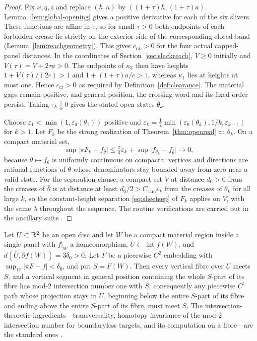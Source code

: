 \begin{proof}
Fix $x,q,z$ and replace $(h,a)$ by $((1+\tau)h,(1+\tau)a)$. Lemma~\ref{lem:global-opening} gives a positive derivative for each of the six slivers. These functions are affine in $\tau$, so for small $\tau>0$ both endpoints of each forbidden crease lie strictly on the exterior side of the corresponding closed band (Lemma~\ref{lem:reachgeometry}). This gives $c_{\mathrm{nb}}>0$ for the four actual capped-panel distances. In the coordinates of Section~\ref{sec:slackreach}, $V\ge0$ initially and $V(\tau)=V+2\tau a>0$. The endpoints of $\kappa_3$ then have heights $1+V(\tau)/(2c)>1$ and $1+(1+\tau)a/c>1$, whereas $\kappa_1$ lies at heights at most one. Hence $c_{\mathrm{cr}}>0$ as required by Definition~\ref{def:clearance}. The material gaps remain positive, and general position, the crossing word and its fixed order persist. Taking $\tau_k\downarrow0$ gives the stated open states $\theta_k$.

Choose $\varepsilon_1<\min(1,\varepsilon_0(\theta_1))$ positive and $\varepsilon_k=\frac12\min(\varepsilon_0(\theta_k),1/k,\varepsilon_{k-1})$ for $k>1$. Let $F_k$ be the strong realization of Theorem~\ref{thm:openreal} at $\theta_k$. On a compact material set,
\[
  \sup\lvert\pi F_k-f_{\bar\theta}\rvert\le\tfrac\pi4\varepsilon_k+\sup\lvert f_{\theta_k}-f_{\bar\theta}\rvert\longrightarrow0 ,
\]
because $\theta\mapsto f_\theta$ is uniformly continuous on compacta: vertices and directions are rational functions of $\theta$ whose denominators stay bounded away from zero near a valid state. For the separation clause, a compact set $V$ at distance $d_0>0$ from the creases of $\bar\theta$ is at distance at least $d_0/2>C_{\mathrm{ram}}\varepsilon_k$ from the creases of $\theta_k$ for all large $k$, so the constant-height separation \eqref{eq:sheetsep} of $F_k$ applies on $V$, with the same $\lambda$ throughout the sequence. The routine verifications are carried out in the ancillary suite \cite{anc}.
\end{proof}

\begin{lemma}\label{lem:mod2}
Let $U\subset\mathbb{R}^2$ be an open disc and let $W$ be a compact material region inside a single panel with $f|_W$ a homeomorphism, $\overline U\subset\operatorname{int}f(W)$, and $d(\overline U,\partial f(W))=3\delta_0>0$. Let $F$ be a piecewise $C^2$ embedding with $\sup_W\lvert\pi F-f\rvert<\delta_0$, and put $S=F(W)$. Then every vertical fibre over $U$ meets $S$, and a vertical segment in general position containing the whole $S$-part of its fibre has mod-2 intersection number one with $S$; consequently any piecewise $C^1$ path whose projection stays in $U$, beginning below the entire $S$-part of its fibre and ending above the entire $S$-part of its fibre, must meet $S$. The intersection-theoretic ingredients---transversality, homotopy invariance of the mod-$2$ intersection number for boundaryless targets, and its computation on a fibre---are the standard ones \cite{gp1974}.
\end{lemma}

